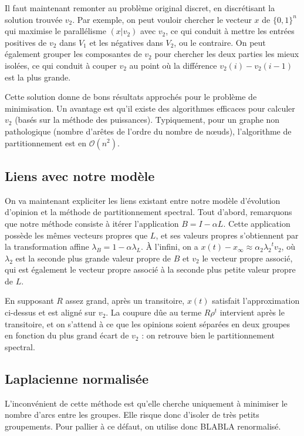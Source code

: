 \documentclass[12pt]{article}
\begin{document}
Il faut maintenant remonter au problème original discret, en
discrétisant la solution trouvée $v_2$. Par exemple, on peut vouloir
chercher le vecteur $x$ de $\{0,1\}^n$ qui maximise le parallélisme
$(x|v_2)$ avec $v_2$, ce qui conduit à mettre les entrées positives de
$v_2$ dans $V_1$ et les négatives dans $V_2$, ou le contraire. On peut
également grouper les composantes de $v_2$ pour chercher les deux
parties les mieux isolées, ce qui conduit à couper $v_2$ au point où
la différence $v_2(i) - v_2(i-1)$ est la plus grande.

Cette solution donne de bons résultats approchés pour le problème de
minimisation. Un avantage est qu'il existe des algorithmes efficaces
pour calculer $v_2$ (basés sur la méthode des
puissances). Typiquement, pour un graphe non pathologique (nombre
d'arêtes de l'ordre du nombre de n\oe uds), l'algorithme de
partitionnement est en $\mathcal O(n^2)$.

\subsection{Liens avec notre modèle}
On va maintenant expliciter les liens existant entre notre modèle
d'évolution d'opinion et la méthode de partitionnement spectral. Tout
d'abord, remarquons que notre méthode consiste à itérer l'application
$B = I - \alpha L$. Cette application possède les mêmes vecteurs
propres que $L$, et ses valeurs propres s'obtiennent par la
transformation affine $\lambda_B = 1 - \alpha \lambda_L$. À l'infini,
on a $x(t) - x_\infty \approx \alpha_2 {\lambda_2}^t v_2$, où
$\lambda_2$ est la seconde plus grande valeur propre de $B$ et $v_2$
le vecteur propre associé, qui est également le vecteur propre associé
à la seconde plus petite valeur propre de $L$.

En supposant $R$ assez grand, après un transitoire, $x(t)$ satisfait
l'approximation ci-dessus et est aligné sur $v_2$. La coupure dûe au
terme $R \rho^t$ intervient après le transitoire, et on s'attend à ce
que les opinions soient séparées en deux groupes en fonction du plus
grand écart de $v_2$ : on retrouve bien le partitionnement spectral.

\subsection{Laplacienne normalisée}
L'inconvénient de cette méthode est qu'elle cherche uniquement à
minimiser le nombre d'arcs entre les groupes. Elle risque donc
d'isoler de très petits groupements. Pour pallier à ce défaut, on
utilise donc BLABLA renormalisé.
\end{document}
